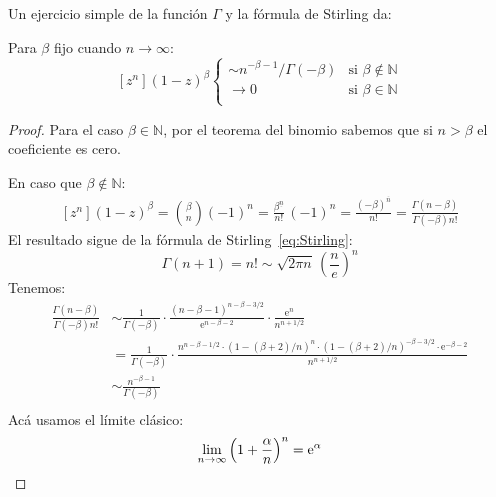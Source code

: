   Un ejercicio simple
  de la función \(\Gamma\)	y la fórmula de Stirling
  da:
  \begin{lemma}
    \label{lem:asymptotics-binomial}
    Para \(\beta\) fijo cuando \(n \rightarrow \infty\):
    \begin{equation*}
      \left[ z^n \right] (1 - z)^\beta
	\begin{cases}
	  \sim n^{- \beta - 1} / \Gamma(- \beta)
	    & \text{si \(\beta \notin \mathbb{N}\)} \\
	  \rightarrow 0
	    & \text{si \(\beta \in \mathbb{N}\)} \\
	\end{cases}
    \end{equation*}
  \end{lemma}
  \begin{proof}
    Para el caso \(\beta \in \mathbb{N}\),
    por el teorema del binomio%
    sabemos que si \(n > \beta\) el coeficiente es cero.

    En caso que \(\beta \notin \mathbb{N}\):
    \begin{align*}
      \left[ z^n \right] (1 - z)^\beta
	= \binom{\beta}{n} (-1)^n
	= \frac{\beta^{\underline{n}}}{n!} \, (-1)^n
	= \frac{(-\beta)^{\overline{n}}}{n!}
	= \frac{\Gamma(n - \beta)}{\Gamma(-\beta) n!}
    \end{align*}
    El resultado
    sigue de la fórmula de Stirling~\eqref{eq:Stirling}:%
    \begin{equation*}
      \Gamma(n + 1)
	= n!
	\sim \sqrt{2 \pi n} \, \left( \frac{n}{e} \right)^n
    \end{equation*}
    Tenemos:
    \begin{align*}
      \frac{\Gamma(n - \beta)}{\Gamma(-\beta) n!}
	&\sim \frac{1}{\Gamma(-\beta)}
		\cdot \frac{(n - \beta - 1)^{n - \beta - 3/2}}
			   {\mathrm{e}^{n - \beta - 2}}
		\cdot \frac{\mathrm{e}^n}{n^{n + 1/2}} \\
	&=    \frac{1}{\Gamma(-\beta)}
		\cdot \frac{n^{n - \beta - 1/2}
			      \cdot (1 - (\beta + 2) / n)^n
			      \cdot (1 - (\beta + 2) / n)^{-\beta - 3/2}
			      \cdot \mathrm{e}^{- \beta - 2}}
			   {n^{n + 1/2}} \\
	&\sim \frac{n^{- \beta - 1}}{\Gamma(-\beta)} \\
    \end{align*}
    Acá usamos el límite clásico:
    \begin{equation*}
      \lim_{n \rightarrow \infty}
	\left( 1 + \frac{\alpha}{n} \right)^n
	= \mathrm{e}^\alpha
     \qedhere
    \end{equation*}
  \end{proof}
